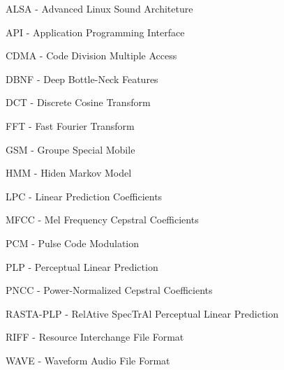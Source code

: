 \begin{acronym}

\item ALSA - Advanced Linux Sound Architeture
\item API - Application Programming Interface


\item CDMA - Code Division Multiple Access

\item DBNF - Deep Bottle-Neck Features 
\item DCT - Discrete Cosine Transform

\item FFT - Fast Fourier Transform
\item GSM - Groupe Special Mobile 
\item HMM - Hiden Markov Model



\item LPC - Linear Prediction Coefficients
\item MFCC - Mel Frequency Cepstral Coefficients



\item PCM - Pulse Code Modulation
\item PLP -  Perceptual Linear Prediction
\item PNCC - Power-Normalized Cepstral Coefficients 

\item RASTA-PLP - RelAtive SpecTrAl  Perceptual Linear Prediction
\item RIFF - Resource Interchange File Format



\item WAVE - Waveform Audio File Format




\end{acronym}